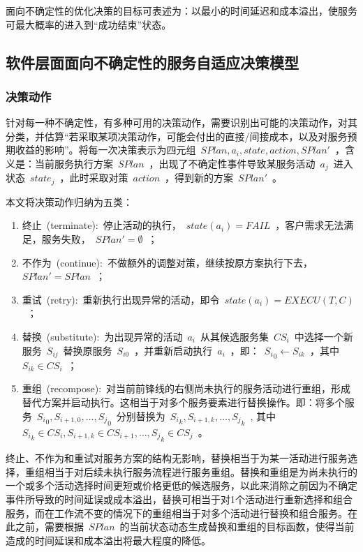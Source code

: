 面向不确定性的优化决策的目标可表述为：以最小的时间延迟和成本溢出，使服务可最大概率的进入到“成功结束”状态。

\subsection{软件层面面向不确定性的服务自适应决策模型}

\subsubsection{决策动作}

针对每一种不确定性，有多种可用的决策动作，需要识别出可能的决策动作，对其分类，并估算“若采取某项决策动作，可能会付出的直接/间接成本，以及对服务预期收益的影响”。将每一次决策表示为四元组~$SPlan,{a_i},state,action,SPlan'$~，含义是：当前服务执行方案~$SPlan$~，出现了不确定性事件导致某服务活动~$a_j$~进入状态~$state_j$~，此时采取对策~$action$~，得到新的方案~$SPlan'$~。

本文将决策动作归纳为五类：
\begin{enumerate}
\item 终止~(terminate):~停止活动的执行，~$state(a_i)=FAIL$~，客户需求无法满足，服务失败，~$SPlan'=\emptyset $~；
\item 不作为~(continue):~不做额外的调整对策，继续按原方案执行下去，~$SPlan'=SPlan$~；
\item 重试~(retry):~重新执行出现异常的活动，即令~$state(a_i)=EXECU(T, C)$~；
\item 替换~(substitute):~为出现异常的活动~$a_i$~从其候选服务集~$CS_i$~中选择一个新服务~$S_{ij}$~替换原服务~$S_{i0}$~，并重新启动执行~$a_i$~，即：~${S_i}_0 \leftarrow {S_{ik}}$~，其中~${S_{ik}} \in C{S_i}$~；
\item 重组~(recompose):~对当前前锋线的右侧尚未执行的服务活动进行重组，形成替代方案并启动执行。这相当于对多个服务要素进行替换操作。即：将多个服务~${S_i}_0,{S_{i + 1,0}}, \ldots ,{S_j}_0$~分别替换为~${S_i}_k,{S_{i + 1,k}}, \ldots ,{S_j}_k$~, 其中~${S_i}_k \in C{S_i},{S_{i + 1,k}} \in C{S_{i + 1}}, \ldots ,{S_j}_k \in C{S_j}$~。
\end{enumerate}

终止、不作为和重试对服务方案的结构无影响，替换相当于为某一活动进行服务选择，重组相当于对后续未执行服务流程进行服务重组。替换和重组是为尚未执行的一个或多个活动选择时间更短或价格更低的候选服务，以此来消除之前因为不确定事件所导致的时间延误或成本溢出，替换可相当于对1个活动进行重新选择和组合服务，而在工作流不变的情况下的重组相当于对多个活动进行替换和组合服务。在此之前，需要根据~$SPlan$~的当前状态动态生成替换和重组的目标函数，使得当前造成的时间延误和成本溢出将最大程度的降低。

